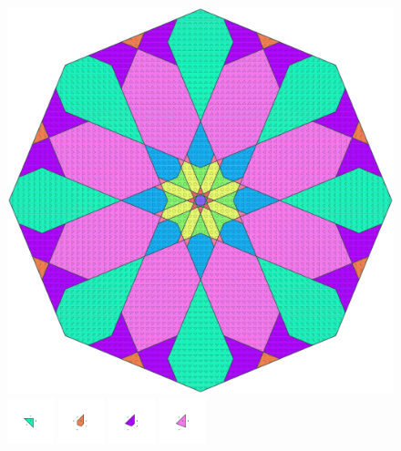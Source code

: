 \documentclass[text.tex]{subfiles}
\begin{document}
\clearpage
\pagestyle{fancy}
\fancyhf{}
\begin{figure}[h!]
\centering
\includegraphics[width=1\textwidth]{img/results/octagon/octagon_206066_(1_3alpha_4).pdf}
\includegraphics[width=0.12\textwidth]{img/results/octagon/octagon_206066_(1_3alpha_4)_001.pdf}
\includegraphics[width=0.12\textwidth]{img/results/octagon/octagon_206066_(1_3alpha_4)_002.pdf}
\includegraphics[width=0.12\textwidth]{img/results/octagon/octagon_206066_(1_3alpha_4)_003.pdf}
\includegraphics[width=0.12\textwidth]{img/results/octagon/octagon_206066_(1_3alpha_4)_004.pdf}

\end{figure}
\end{document}
